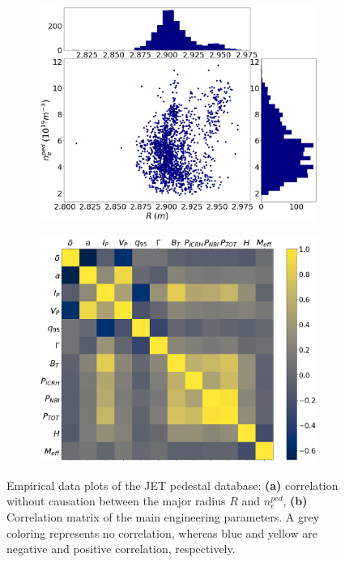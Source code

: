 \documentclass[a4paper, twoside, final, 12pt]{article}
\begin{document}
\begin{figure}[h]
        \centering
        \begin{subfigure}{0.5\linewidth}
                \centering
                \includegraphics[scale=0.2]{./src/R_vs_NEPED_matplotlib}
                \caption{}
                \label{subfig:icecream}
        \end{subfigure} \hfill
        \begin{subfigure}{0.45\linewidth}
                \centering
                \includegraphics[scale=0.2]{./src/input_correlations}
                \caption{}
                \label{subfig:corr}
        \end{subfigure}
	\caption{Empirical data plots of the JET pedestal database: \textbf{(a)} correlation without causation between the major radius $R$ and $n_e^{ped}$,  \textbf{(b)}  Correlation matrix of the main engineering parameters. A grey coloring represents no correlation, whereas blue and yellow are negative and positive correlation, respectively.}
	\label{fig:emperical}
\end{figure}
\end{document}
